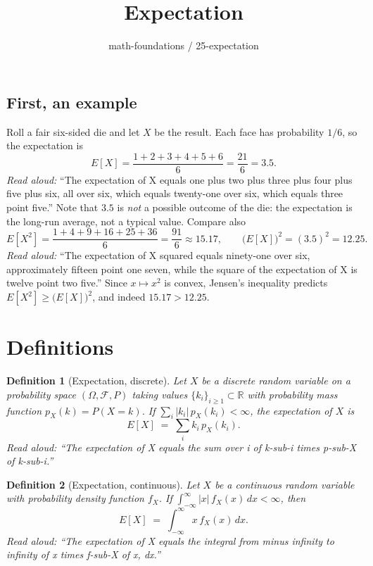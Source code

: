 \documentclass[11pt]{article}
\title{Expectation}
\author{math-foundations / 25-expectation}
\date{}
\newtheorem{definition}{Definition}
\begin{document}
\maketitle

\subsection*{First, an example}
Roll a fair six-sided die and let $X$ be the result. Each face has probability
$1/6$, so the expectation is
\[
E[X] = \frac{1 + 2 + 3 + 4 + 5 + 6}{6} = \frac{21}{6} = 3.5.
\]
\emph{Read aloud:} ``The expectation of X equals one plus two plus three plus four plus five plus six, all over six, which equals twenty-one over six, which equals three point five.''
Note that $3.5$ is \emph{not} a possible outcome of the die: the expectation
is the long-run average, not a typical value. Compare also
\[
E[X^2] = \frac{1 + 4 + 9 + 16 + 25 + 36}{6} = \frac{91}{6} \approx 15.17,
\qquad
\big(E[X]\big)^2 = (3.5)^2 = 12.25.
\]
\emph{Read aloud:} ``The expectation of X squared equals ninety-one over six, approximately fifteen point one seven, while the square of the expectation of X is twelve point two five.''
Since $x \mapsto x^2$ is convex, Jensen's inequality predicts
$E[X^2] \ge \big(E[X]\big)^2$, and indeed $15.17 > 12.25$.

\section{Definitions}

\begin{definition}[Expectation, discrete]
Let $X$ be a discrete random variable on a probability space
$(\Omega, \mathcal{F}, P)$ taking values $\{k_i\}_{i \ge 1} \subset \mathbb{R}$
with probability mass function $p_X(k) = P(X = k)$. If
$\sum_{i} |k_i|\, p_X(k_i) < \infty$, the \emph{expectation} of $X$ is
\[
E[X] \;=\; \sum_{i} k_i\, p_X(k_i).
\]
\emph{Read aloud:} ``The expectation of X equals the sum over i of k-sub-i times p-sub-X of k-sub-i.''
\end{definition}

\begin{definition}[Expectation, continuous]
Let $X$ be a continuous random variable with probability density function
$f_X$. If $\int_{-\infty}^{\infty} |x|\, f_X(x)\, dx < \infty$, then
\[
E[X] \;=\; \int_{-\infty}^{\infty} x\, f_X(x)\, dx.
\]
\emph{Read aloud:} ``The expectation of X equals the integral from minus infinity to infinity of x times f-sub-X of x, dx.''
\end{definition}
\end{document}
